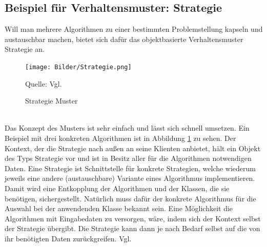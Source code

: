 \documentclass[fontsize=11pt,a4paper,final]{scrreprt}[2003/01/01]
\newcommand*{\quelle}{%
	\footnotesize Quelle: 
}
\begin{document}
\subsection{Beispiel für Verhaltensmuster: Strategie}
Will man mehrere Algorithmen zu einer bestimmten Problemstellung kapseln und austauschbar machen, bietet sich dafür das objektbasierte Verhaltensmuster Strategie an.

\begin{figure}[H]
	\centering
	\texttt{[image: Bilder/Strategie.png]}
	\caption{Strategie Muster}
	\quelle{Vgl. \cite[S. 375]{gamma2004}} 
	\label{fig:Strategie}
\end{figure}
\ \\
Das Konzept des Musters ist sehr einfach und lässt sich schnell umsetzen. Ein Beispiel mit drei konkreten Algorithmen ist in Abbildung \ref{fig:Strategie} zu sehen. Der Kontext, der die Strategie nach außen an seine Klienten anbietet, hält ein Objekt des Typs Strategie vor und ist in Besitz aller für die Algorithmen notwendigen Daten. Eine Strategie ist Schnittstelle für konkrete Strategien, welche wiederum jeweils eine andere (austauschbare) Variante eines Algorithmus implementieren. Damit wird eine Entkopplung der Algorithmen und der Klassen, die sie benötigen, sichergestellt. Natürlich muss dafür der konkrete Algorithmus für die Auswahl bei der anwendenden Klasse bekannt sein. Eine Möglichkeit die Algorithmen mit Eingabedaten zu versorgen, wäre, indem sich der Kontext selbst der Strategie übergibt. Die Strategie kann dann je nach Bedarf selbst auf die von ihr benötigten Daten zurückgreifen. Vgl. \cite[S. 373 - 384]{gamma2004}
\end{document}
